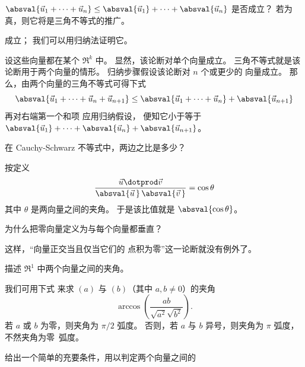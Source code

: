   \item 
    \( \absval{\vec{u}_1+\cdots+\vec{u}_n} \leq
         \absval{\vec{u}_1}+\cdots+\absval{\vec{u}_n} \)
    是否成立？
    若为真，则它将是三角不等式的推广。
    \begin{answer}
      成立；
      我们可以用归纳法证明它。

      设这些向量都在某个 \( \Re^k \) 中。
      显然，该论断对单个向量成立。
      三角不等式就是该论断用于两个向量的情形。
      归纳步骤假设该论断对 \( n \) 个或更少的
      向量成立。
      那么，由两个向量的三角不等式可得下式
      \begin{equation*}
         \absval{\vec{u}_1+\cdots+\vec{u}_n+\vec{u}_{n+1}}
         \leq
         \absval{\vec{u}_1+\cdots+\vec{u}_n}+\absval{\vec{u}_{n+1}}
      \end{equation*}
      再对右端第一个和项
      应用归纳假设，
      便知它小于等于
      \( \absval{\vec{u}_1}+\cdots+\absval{\vec{u}_n}+\absval{\vec{u}_{n+1}} \)。  
    \end{answer}
  \item  
    在 Cauchy-Schwarz 不等式中，两边之比是多少？
    \begin{answer}
      按定义
      \begin{equation*}
        \frac{\vec{u}\dotprod\vec{v}}{
            \absval{\vec{u}\,}\,\absval{\vec{v}\,}}=\cos\theta
      \end{equation*}
      其中 \( \theta \) 是两向量之间的夹角。
      于是该比值就是 \( \absval{\cos\theta} \)。  
   \end{answer}
  \item 
    为什么把零向量定义为与每个向量都垂直？
    \begin{answer}
      这样，“向量正交当且仅当它们的
      点积为零”这一论断就没有例外了。
    \end{answer}
  \item 
    描述 \( \Re^1 \) 中两个向量之间的夹角。
    \begin{answer}
      我们可用下式
      来求 \( (a) \) 与 \( (b) \)（其中 \( a,b\neq 0 \)）的夹角
      \begin{equation*}
         \arccos(\frac{ab}{\sqrt{a^2}\sqrt{b^2}}).
      \end{equation*}
      若 \( a \) 或 \( b \) 为零，则夹角为 \( \pi/2 \) 弧度。
      否则，若 \( a \) 与 \( b \) 异号，则夹角为
      \( \pi \) 弧度，不然夹角为零~弧度。  
   \end{answer}
  \item 
    给出一个简单的充要条件，用以判定两个向量之间的
